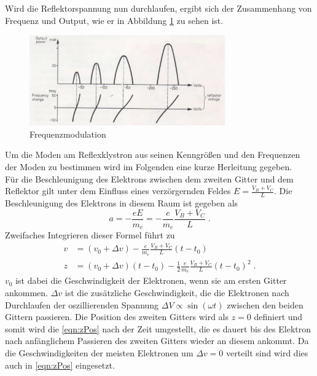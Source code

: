         Wird die Reflektorspannung nun durchlaufen, ergibt sich der Zusammenhang von Frequenz und Output, wie er in Abbildung \ref{fig:frequenzmodulation} zu sehen ist.
        \begin{figure}
            \centering
            \includegraphics[width = 0.75\textwidth]{bilder/Frequenzmodulation.png}
            \caption{Frequenzmodulation}
            \label{fig:frequenzmodulation}
        \end{figure}
        Um die Moden am Reflexklystron aus seinen Kenngrößen und den Frequenzen der Moden zu bestimmen wird im Folgenden eine kurze Herleitung gegeben.\\
        Für die Beschleunigung des Elektrons zwischen dem  zweiten Gitter und dem Reflektor gilt unter dem Einfluss eines verzörgernden Feldes $E = \frac{V_B + V_C}{L}$.
        Die Beschleunigung des Elektrons in diesem Raum ist gegeben als
        \begin{equation*}
            a = -\frac{e E}{m_e} = - \frac{e}{m_e} \frac{V_B + V_C}{L} \;.
        \end{equation*}
        Zweifaches Integrieren dieser Formel führt zu
        \begin{align}
            v &= (v_0 + \Delta v) - \frac{e}{m_e} \frac{V_B + V_C}{L} (t - t_0) \\[3pt]
            z &= (v_0 + \Delta v) (t - t_0) - \frac{1}{2} \frac{e}{m_e} \frac{V_B + V_C}{L} (t - t_0)^2 \;.
            \label{eqn:zPos}
        \end{align}
        $v_0$ ist dabei die Geschwindigkeit der Elektronen, wenn sie am ersten Gitter ankommen.
        $\Delta v$ ist die zusätzliche Geschwindigkeit, die die Elektronen nach Durchlaufen der oszillierenden Spannung $\Delta V \propto \sin(\omega t)$ zwischen den beiden Gittern passieren.
        Die Position des zweiten Gitters wird als $z = 0$ definiert und somit wird die \autoref{eqn:zPos} nach der Zeit umgestellt, die es dauert bis des Elektron nach anfänglichem Passieren des zweiten Gitters wieder an diesem ankommt.
        Da die Geschwindigkeiten der meisten Elektronen um $\Delta v = 0$ verteilt sind wird dies auch in \autoref{eqn:zPos} eingesetzt.
